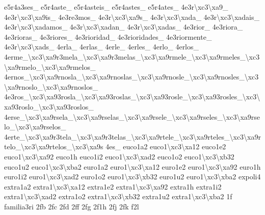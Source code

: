 \begin{DoxyCompactItemize}
e5r4a3ses\-\_\- e5r4aste\-\_\- e5r4asteis\-\_\- e5r4astes\-\_\- e5r4ates\-\_\- 4e3r\textbackslash{}xc3\textbackslash{}xa9\-\_\- 4e3r\textbackslash{}xc3\textbackslash{}xa9is\-\_\- 4e3re3mos\-\_\- 4e3r\textbackslash{}xc3\textbackslash{}xa9s\-\_\- 4e3r\textbackslash{}xc3\textbackslash{}xada\-\_\- 4e3r\textbackslash{}xc3\textbackslash{}xadais\-\_\- 4e3r\textbackslash{}xc3\textbackslash{}xadamos\-\_\- 4e3r\textbackslash{}xc3\textbackslash{}xadan\-\_\- 4e3r\textbackslash{}xc3\textbackslash{}xadas\-\_\- 4e3rior\-\_\- 4e3riora\-\_\- 4e3rioras\-\_\- 4e3riores\-\_\- 4e3rioridad\-\_\- 4e3rioridades\-\_\- 4e3riormente\-\_\- 4e3r\textbackslash{}xc3\textbackslash{}xads\-\_\- 4erla\-\_\- 4erlas\-\_\- 4erle\-\_\- 4erles\-\_\- 4erlo\-\_\- 4erlos\-\_\- 4erme\-\_\textbackslash{}xc3\textbackslash{}xa9r3mela\-\_\textbackslash{}xc3\textbackslash{}xa9r3melas\-\_\textbackslash{}xc3\textbackslash{}xa9rmele\-\_\textbackslash{}xc3\textbackslash{}xa9rmeles\-\_\textbackslash{}xc3\textbackslash{}xa9rmelo\-\_\textbackslash{}xc3\textbackslash{}xa9rmelos\-\_\- 4ernos\-\_\textbackslash{}xc3\textbackslash{}xa9rnosla\-\_\textbackslash{}xc3\textbackslash{}xa9rnoslas\-\_\textbackslash{}xc3\textbackslash{}xa9rnosle\-\_\textbackslash{}xc3\textbackslash{}xa9rnosles\-\_\textbackslash{}xc3\textbackslash{}xa9rnoslo\-\_\textbackslash{}xc3\textbackslash{}xa9rnoslos\-\_\- 4e3ros\-\_\textbackslash{}xc3\textbackslash{}xa93rosla\-\_\textbackslash{}xc3\textbackslash{}xa93roslas\-\_\textbackslash{}xc3\textbackslash{}xa93rosle\-\_\textbackslash{}xc3\textbackslash{}xa93rosles\-\_\textbackslash{}xc3\textbackslash{}xa93roslo\-\_\textbackslash{}xc3\textbackslash{}xa93roslos\-\_\- 4erse\-\_\textbackslash{}xc3\textbackslash{}xa9rsela\-\_\textbackslash{}xc3\textbackslash{}xa9rselas\-\_\textbackslash{}xc3\textbackslash{}xa9rsele\-\_\textbackslash{}xc3\textbackslash{}xa9rseles\-\_\textbackslash{}xc3\textbackslash{}xa9rselo\-\_\textbackslash{}xc3\textbackslash{}xa9rselos\-\_\- 4erte\-\_\textbackslash{}xc3\textbackslash{}xa9r3tela\-\_\textbackslash{}xc3\textbackslash{}xa9r3telas\-\_\textbackslash{}xc3\textbackslash{}xa9rtele\-\_\textbackslash{}xc3\textbackslash{}xa9rteles\-\_\textbackslash{}xc3\textbackslash{}xa9rtelo\-\_\textbackslash{}xc3\textbackslash{}xa9rtelos\-\_\textbackslash{}xc3\textbackslash{}xa9s 4es\-\_\- euco1a2 euco1\textbackslash{}xc3\textbackslash{}xa12 euco1e2 euco1\textbackslash{}xc3\textbackslash{}xa92 euco1h euco1i2 euco1\textbackslash{}xc3\textbackslash{}xad2 euco1o2 euco1\textbackslash{}xc3\textbackslash{}xb32 euco1u2 euco1\textbackslash{}xc3\textbackslash{}xba2 euro1a2 euro1\textbackslash{}xc3\textbackslash{}xa12 euro1e2 euro1\textbackslash{}xc3\textbackslash{}xa92 euro1h euro1i2 euro1\textbackslash{}xc3\textbackslash{}xad2 euro1o2 euro1\textbackslash{}xc3\textbackslash{}xb32 euro1u2 euro1\textbackslash{}xc3\textbackslash{}xba2 expoli4 extra1a2 extra1\textbackslash{}xc3\textbackslash{}xa12 extra1e2 extra1\textbackslash{}xc3\textbackslash{}xa92 extra1h extra1i2 extra1\textbackslash{}xc3\textbackslash{}xad2 extra1o2 extra1\textbackslash{}xc3\textbackslash{}xb32 extra1u2 extra1\textbackslash{}xc3\textbackslash{}xba2 1f familia3ri 2fb 2fc 2fd 2ff 2fg 2f1h 2fj 2fk f2l 
\end{DoxyCompactItemize}
